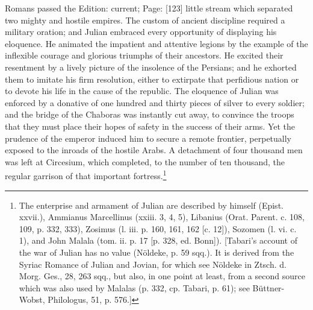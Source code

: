 Romans passed the Edition: current; Page: [123] little stream which separated two mighty and hostile empires. The custom of ancient discipline required a military oration; and Julian embraced every opportunity of displaying his eloquence. He animated the impatient and attentive legions by the example of the inflexible courage and glorious triumphs of their ancestors. He excited their resentment by a lively picture of the insolence of the Persians; and he exhorted them to imitate his firm resolution, either to extirpate that perfidious nation or to devote his life in the cause of the republic. The eloquence of Julian was enforced by a donative of one hundred and thirty pieces of silver to every soldier; and the bridge of the Chaboras was instantly cut away, to convince the troops that they must place their hopes of safety in the success of their arms. Yet the prudence of the emperor induced him to secure a remote frontier, perpetually exposed to the inroads of the hostile Arabs. A detachment of four thousand men was left at Circesium, which completed, to the number of ten thousand, the regular garrison of that important fortress.\footnote{The enterprise and armament of Julian are described by himself (Epist. xxvii.), Ammianus Marcellinus (xxiii. 3, 4, 5), Libanius (Orat. Parent. c. 108, 109, p. 332, 333), Zosimus (l. iii. p. 160, 161, 162 [c. 12]), Sozomen (l. vi. c. 1), and John Malala (tom. ii. p. 17 [p. 328, ed. Bonn]). [Tabari\texthebrew{}’s account of the war of Julian has no value (Nöldeke, p. 59 sqq.). It is derived from the Syriac Romance of Julian and Jovian, for which see Nöldeke in Ztsch. d. Morg. Ges., 28, 263 sqq., but also, in one point at least, from a second source which was also used by Malalas (p. 332, cp. Tabari, p. 61); see Büttner-Wobst, Philologus, 51, p. 576.]}

